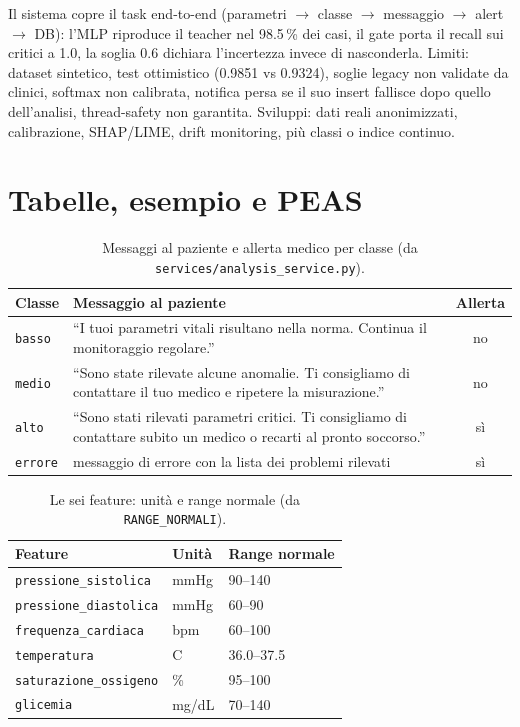 \documentclass[11pt,a4paper]{article}
\newcommand{\codice}[1]{\texttt{#1}}
\newcommand{\file}[1]{\texttt{#1}}
\begin{document}
Il sistema copre il task end-to-end (parametri $\to$ classe $\to$ messaggio
$\to$ alert $\to$ DB): l'MLP riproduce il teacher nel 98.5\,\% dei casi, il
gate porta il recall sui critici a 1.0, la soglia 0.6 dichiara l'incertezza
invece di nasconderla. Limiti: dataset sintetico, test ottimistico (0.9851
vs 0.9324), soglie legacy non validate da clinici, softmax non calibrata,
notifica persa se il suo insert fallisce dopo quello dell'analisi,
thread-safety non garantita. Sviluppi: dati reali anonimizzati, calibrazione,
SHAP/LIME, drift monitoring, più classi o indice continuo.

\appendix
\section{Tabelle, esempio e PEAS}\label{sec:appendice}

\begin{table}[htbp]
\centering
\caption{Messaggi al paziente e allerta medico per classe (da \file{services/analysis\_service.py}).}
\label{tab:messaggi}
\small
\begin{tabular}{lp{8cm}c}
\toprule
\textbf{Classe} & \textbf{Messaggio al paziente} & \textbf{Allerta} \\
\midrule
\codice{basso} & ``I tuoi parametri vitali risultano nella norma. Continua il monitoraggio regolare.'' & no \\
\codice{medio} & ``Sono state rilevate alcune anomalie. Ti consigliamo di contattare il tuo medico e ripetere la misurazione.'' & no \\
\codice{alto} & ``Sono stati rilevati parametri critici. Ti consigliamo di contattare subito un medico o recarti al pronto soccorso.'' & sì \\
\codice{errore} & messaggio di errore con la lista dei problemi rilevati & sì \\
\bottomrule
\end{tabular}
\end{table}

\begin{table}[htbp]
\centering
\caption{Le sei feature: unità e range normale (da \codice{RANGE\_NORMALI}).}
\label{tab:feature}
\small
\begin{tabular}{lll}
\toprule
\textbf{Feature} & \textbf{Unità} & \textbf{Range normale} \\
\midrule
\codice{pressione\_sistolica} & mmHg & 90--140 \\
\codice{pressione\_diastolica} & mmHg & 60--90 \\
\codice{frequenza\_cardiaca} & bpm & 60--100 \\
\codice{temperatura} & \textdegree{}C & 36.0--37.5 \\
\codice{saturazione\_ossigeno} & \% & 95--100 \\
\codice{glicemia} & mg/dL & 70--140 \\
\bottomrule
\end{tabular}
\end{table}
\end{document}

